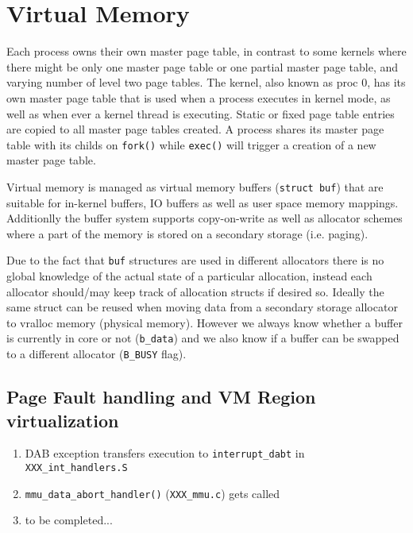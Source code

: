 \chapter{Virtual Memory}

Each process owns their own master page table, in contrast to some kernels where
there might be only one master page table or one partial master page table,
and varying number of level two page tables. The kernel, also known as proc 0,
has its own master page table that is used when a process executes in kernel
mode, as well as when ever a kernel thread is executing. Static or fixed page
table entries are copied to all master page tables created. A process shares its
master page table with its childs on \verb+fork()+ while \verb+exec()+ will
trigger a creation of a new master page table.

Virtual memory is managed as virtual memory buffers (\verb+struct buf+) that
are suitable for in-kernel buffers, IO buffers as well as user space memory
mappings. Additionlly the buffer system supports copy-on-write as well as
allocator schemes where a part of the memory is stored on a secondary
storage (i.e. paging).

Due to the fact that \verb+buf+ structures are used in different allocators
there is no global knowledge of the actual state of a particular allocation,
instead each allocator should/may keep track of allocation structs if desired
so. Ideally the same struct can be reused when moving data from a secondary
storage allocator to vralloc memory (physical memory). However we
always know whether a buffer is currently in core or not (\verb+b_data+) and
we also know if a buffer can be swapped to a different allocator
(\verb+B_BUSY+ flag).

\section{Page Fault handling and VM Region virtualization}

\begin{enumerate}
\item DAB exception transfers execution to \verb+interrupt_dabt+ in \verb+XXX_int_handlers.S+
\item \verb+mmu_data_abort_handler()+ (\verb+XXX_mmu.c+) gets called
\item to be completed...
\end{enumerate}
